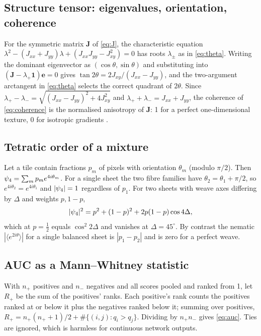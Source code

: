 \subsection{Structure tensor: eigenvalues, orientation, coherence}
\label{app:st}
For the symmetric matrix $\mathbf J$ of \cref{eq:J}, the characteristic equation $\lambda^{2}-(J_{xx}+J_{yy})\lambda+(J_{xx}J_{yy}-J_{xy}^{2})=0$ has roots $\lambda_\pm$ as in \cref{eq:theta}. Writing the dominant eigenvector as $(\cos\theta,\sin\theta)$ and substituting into $(\mathbf J-\lambda_+\mathbf 1)\mathbf e=0$ gives $\tan2\theta=2J_{xy}/(J_{xx}-J_{yy})$, and the two-argument arctangent in \cref{eq:theta} selects the correct quadrant of $2\theta$. Since $\lambda_+-\lambda_-=\sqrt{(J_{xx}-J_{yy})^{2}+4J_{xy}^{2}}$ and $\lambda_++\lambda_-=J_{xx}+J_{yy}$, the coherence of \cref{eq:coherence} is the normalised anisotropy of $\mathbf J$: 1 for a perfect one-dimensional texture, 0 for isotropic gradients \cite{bigun1987}.

\subsection{Tetratic order of a mixture}
\label{app:mixture}
Let a tile contain fractions $p_m$ of pixels with orientation $\theta_m$ (modulo $\pi/2$). Then $\psi_4=\sum_m p_m e^{4i\theta_m}$. For a single sheet the two fibre families have $\theta_2=\theta_1+\pi/2$, so $e^{4i\theta_2}=e^{4i\theta_1}$ and $|\psi_4|=1$ regardless of $p_1$. For two sheets with weave axes differing by $\Delta$ and weights $p,1-p$,
\[
|\psi_4|^{2}=p^{2}+(1-p)^{2}+2p(1-p)\cos4\Delta ,
\]
which at $p=\tfrac12$ equals $\cos^{2}2\Delta$ and vanishes at $\Delta=45^{\circ}$. By contrast the nematic $|\langle e^{2i\theta}\rangle|$ for a single balanced sheet is $|p_1-p_2|$ and is zero for a perfect weave.

\subsection{AUC as a Mann--Whitney statistic}
\label{app:auc}
With $n_+$ positives and $n_-$ negatives and all scores pooled and ranked from 1, let $R_+$ be the sum of the positives' ranks. Each positive's rank counts the positives ranked at or below it plus the negatives ranked below it; summing over positives, $R_+=n_+(n_++1)/2+\#\{(i,j):q_i>q_j\}$. Dividing by $n_+n_-$ gives \cref{eq:auc}. Ties are ignored, which is harmless for continuous network outputs.

